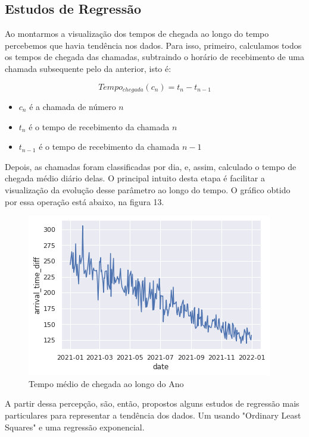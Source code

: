 \subsection{Estudos de Regressão}

Ao montarmos a visualização dos tempos de chegada ao longo do tempo percebemos que havia tendência nos dados. Para isso, primeiro, calculamos todos os tempos de chegada das chamadas, subtraindo o horário de recebimento de uma chamada subsequente pelo da anterior, isto é:

$$Tempo_{chegada}(c_n) = t_n - t_{n-1}$$ 

\begin{itemize}
    \item $c_n$ é a chamada de número $n$
    \item $t_n$ é o tempo de recebimento da chamada $n$
    \item $t_{n-1}$ é o tempo de recebimento da chamada $n-1$
\end{itemize}

Depois, as chamadas foram classificadas por dia, e, assim, calculado o tempo de chegada médio diário delas. O principal intuito desta etapa é facilitar a visualização da evolução desse parâmetro ao longo do tempo. O gráfico obtido por essa operação está abaixo, na figura 13.

\begin{figure}[H]
    \includegraphics{analise-de-dados/regressao/tempo_chegada_medio.png}
    \caption{Tempo médio de chegada ao longo do Ano}
    \label{fig: tempos_de_chegada}
\end{figure}

A partir dessa percepção, são, então, propostos alguns estudos de regressão mais particulares para representar a tendência dos dados. Um usando "Ordinary Least Squares" e uma regressão exponencial.  

